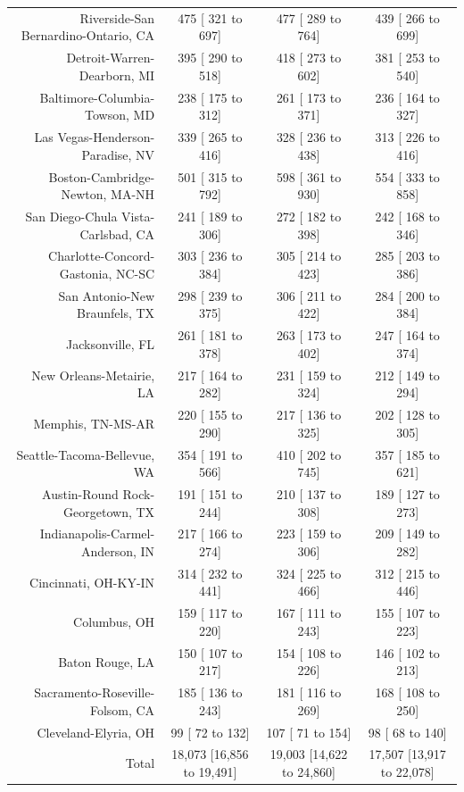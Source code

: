 \documentclass{article}
\begin{document}
\begin{table}[H]
\begin{tabular}{|r|c|c|c|}
		Riverside-San Bernardino-Ontario, CA &    475 [   321 to    697] &    477 [   289 to    764] &    439 [   266 to    699]\\
		Detroit-Warren-Dearborn, MI &    395 [   290 to    518] &    418 [   273 to    602] &    381 [   253 to    540]\\
		Baltimore-Columbia-Towson, MD &    238 [   175 to    312] &    261 [   173 to    371] &    236 [   164 to    327]\\
		Las Vegas-Henderson-Paradise, NV &    339 [   265 to    416] &    328 [   236 to    438] &    313 [   226 to    416]\\
		Boston-Cambridge-Newton, MA-NH &    501 [   315 to    792] &    598 [   361 to    930] &    554 [   333 to    858]\\
		San Diego-Chula Vista-Carlsbad, CA &    241 [   189 to    306] &    272 [   182 to    398] &    242 [   168 to    346]\\
		Charlotte-Concord-Gastonia, NC-SC &    303 [   236 to    384] &    305 [   214 to    423] &    285 [   203 to    386]\\
		San Antonio-New Braunfels, TX &    298 [   239 to    375] &    306 [   211 to    422] &    284 [   200 to    384]\\
		Jacksonville, FL &    261 [   181 to    378] &    263 [   173 to    402] &    247 [   164 to    374]\\
		New Orleans-Metairie, LA &    217 [   164 to    282] &    231 [   159 to    324] &    212 [   149 to    294]\\
		Memphis, TN-MS-AR &    220 [   155 to    290] &    217 [   136 to    325] &    202 [   128 to    305]\\
		Seattle-Tacoma-Bellevue, WA &    354 [   191 to    566] &    410 [   202 to    745] &    357 [   185 to    621]\\
		Austin-Round Rock-Georgetown, TX &    191 [   151 to    244] &    210 [   137 to    308] &    189 [   127 to    273]\\
		Indianapolis-Carmel-Anderson, IN &    217 [   166 to    274] &    223 [   159 to    306] &    209 [   149 to    282]\\
		Cincinnati, OH-KY-IN &    314 [   232 to    441] &    324 [   225 to    466] &    312 [   215 to    446]\\
		Columbus, OH &    159 [   117 to    220] &    167 [   111 to    243] &    155 [   107 to    223]\\
		Baton Rouge, LA &    150 [   107 to    217] &    154 [   108 to    226] &    146 [   102 to    213]\\
		Sacramento-Roseville-Folsom, CA &    185 [   136 to    243] &    181 [   116 to    269] &    168 [   108 to    250]\\
		Cleveland-Elyria, OH &     99 [    72 to    132] &    107 [    71 to    154] &     98 [    68 to    140]\\
		\hline
		Total & 18,073 [16,856 to 19,491] & 19,003 [14,622 to 24,860] & 17,507 [13,917 to 22,078]\\
		\hline
	\end{tabular}
\end{table}
\end{document}
